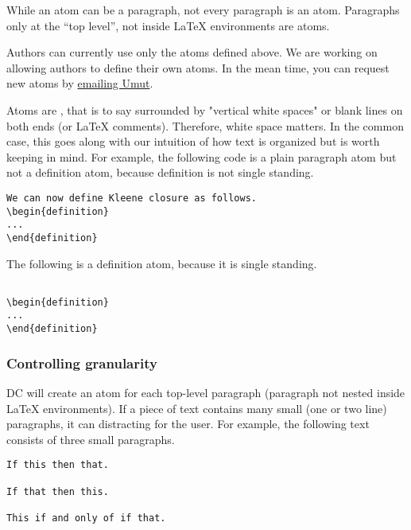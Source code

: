 \begin{note}
While an atom can be a paragraph, not every paragraph is an atom.  Paragraphs only at the ``top level'', not inside LaTeX environments are atoms. 
\end{note}

\begin{note}
Authors can currently use only the atoms defined above. We are working on allowing authors to define their own atoms.  
%
In the mean time, you can request new atoms by 
\href{mailto:umut@cs.cmu.edu}{emailing Umut}.
\end{note}

\begin{important}
Atoms are , that is to say surrounded by "vertical
white spaces" or blank lines on both ends (or LaTeX comments).
%
Therefore,  white space  matters. In the common case, this goes along with our intuition of how text is organized but is worth keeping in mind. For example, the following code is a plain paragraph atom but not a definition atom, because definition is not single standing.

\begin{lstlisting}
We can now define Kleene closure as follows.
\begin{definition}
...
\end{definition}
\end{lstlisting}

The following is a definition atom, because it is single standing.
\begin{lstlisting}

\begin{definition}
...
\end{definition}

\end{lstlisting}
\end{important}

\subsubsection{Controlling granularity}

DC will create an atom for each top-level paragraph (paragraph not nested inside LaTeX environments).  If a piece of text contains many small (one or two line) paragraphs, it can distracting for the user.  For example, the following text consists of three small paragraphs.
%
\begin{lstlisting}
If this then that.

If that then this.

This if and only of if that.
\end{lstlisting}

